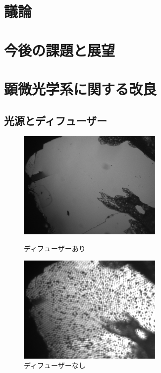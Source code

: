 \documentclass[11pt,a4paper]{jsarticle}
\begin{document}
\section{議論}

\section{今後の課題と展望}


\newpage
\appendix
\section{顕微光学系に関する改良}
\subsection{光源とディフューザー}
\begin{figure}[htbp]
 \begin{minipage}{0.5\hsize}
  \begin{center}
   \includegraphics[width=70mm]{with_diffuser.eps}
  \end{center}
  \caption{ディフューザーあり}
  \label{fig:with_diffuser}
 \end{minipage}
 \begin{minipage}{0.5\hsize}
  \begin{center}
   \includegraphics[width=70mm]{without_diffuser.eps}
  \end{center}
  \caption{ディフューザーなし}
  \label{fig:without_diffuser}
 \end{minipage}
\end{figure}
\end{document}
